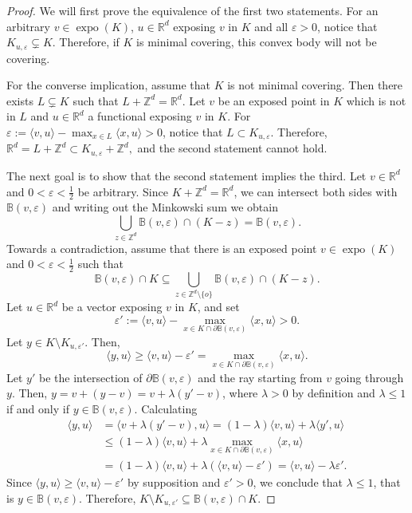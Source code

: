 \documentclass[11pt, a4paper]{amsart}
\newcommand{\RR}{\mathbb{R}}
\newcommand{\ZZ}{\mathbb{Z}}
\newcommand{\ball}{\mathbb{B}}
\DeclareMathOperator{\expo}{expo}
\newcommand{\origin}{o}
\numberwithin{equation}{section}
\theoremstyle{plain}
\begin{document}
\begin{proof} 
We will first prove the equivalence of the first two statements.
For an arbitrary $v\in \expo(K)$, $u\in \RR^d$ exposing $v$ in $K$ and all $\varepsilon>0$, notice that $K_{u,\varepsilon}\subsetneq K$. Therefore, if $K$ is minimal covering, this convex body will not be covering.

For the converse implication, assume that $K$ is not minimal covering. Then there exists $L\subsetneq K$ such that $L+\ZZ^d=\RR^d$. Let $v$ be an exposed point in $K$ which is not in $L$ and $u\in \RR^d$ a functional exposing $v$ in $K$. For $\varepsilon:=\langle v,u\rangle-\max_{x\in L}\langle x,u\rangle>0$, notice that $L\subset K_{u,\varepsilon}$. Therefore, $\RR^d=L+\ZZ^d\subset K_{u,\varepsilon}+\ZZ^d,$ and the second statement cannot hold.

The next goal is to show that the second statement implies the third. 
Let $v\in \RR^d$ and $0<\varepsilon<\frac{1}{2}$ be arbitrary. Since $K+\ZZ^d=\RR^d$, we can intersect both sides with $\ball(v, \varepsilon)$ and writing out the Minkowski sum we obtain 
\[
\bigcup \limits_{z\in \ZZ^d} \ball (v, \varepsilon)\cap (K-z)=\ball(v,\varepsilon).
\]
 Towards a contradiction, assume that there is an exposed point $v\in \expo(K)$ and $0<\varepsilon<\frac{1}{2}$ such that
\begin{equation}\label{eq:balls_contradiction}
\ball(v,\varepsilon)\cap K \subseteq\bigcup \limits_{z\in \ZZ^d\setminus \{\origin\}} \ball (v, \varepsilon)\cap (K-z).
\end{equation}
\noindent Let $u\in \RR^d$ be a vector exposing $v$ in $K$, and set 
\[
\varepsilon':= \langle v,u\rangle-\max_{x\in K\cap \partial \ball(v,\varepsilon)}\langle x,u\rangle>0.
\]
Let $y\in K\setminus K_{u, \varepsilon'}$. Then, \[
\langle y,u\rangle \geq \langle v,u\rangle-\varepsilon'=\max_{x\in K\cap \partial \ball(v,\varepsilon)}\langle x,u\rangle.
\]
 Let $y'$ be the intersection of $\partial\ball(v, \varepsilon)$ and the ray starting from $v$ going through $y$. Then, $y=v+(y-v)=v+\lambda(y'-v)$, where $\lambda>0$ by definition and $\lambda\leq 1$ if and only if $y\in \ball(v, \varepsilon)$.
Calculating
\[
\begin{split}
\langle y,u\rangle &= \langle v+\lambda(y'-v) , u \rangle = (1-\lambda)\langle v,u\rangle +\lambda \langle y',u\rangle\\
& \leq (1-\lambda)\langle v,u\rangle + \lambda\max_{x\in K\cap \partial \ball(v,\varepsilon)} \langle x,u\rangle \\
&=(1-\lambda)\langle v,u\rangle+\lambda(\langle v,u\rangle-\varepsilon')=\langle v,u\rangle-\lambda\varepsilon'.
\end{split}
\]
Since $\langle y,u\rangle\geq\langle v,u\rangle - \varepsilon'$ by supposition and $\varepsilon'>0$, we conclude that $\lambda\leq 1$, that is $y\in \ball(v,\varepsilon)$. Therefore, $K\setminus K_{u,\varepsilon'}\subseteq \ball(v,\varepsilon)\cap K$.


\end{proof}
\end{document}
